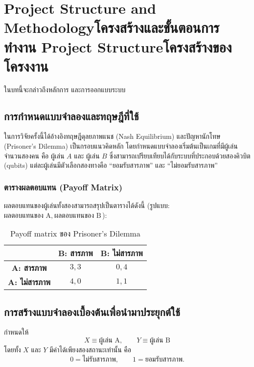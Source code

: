 \chapter{\ifproject%
\ifenglish Project Structure and Methodology\else โครงสร้างและขั้นตอนการทำงาน\fi
\else%
\ifenglish Project Structure\else โครงสร้างของโครงงาน\fi
\fi
}

ในบทนี้จะกล่าวถึงหลักการ และการออกแบบระบบ

\section{การกำหนดแบบจำลองและทฤษฎีที่ใช้}
ในการวิจัยครั้งนี้ได้อ้างอิงทฤษฎีดุลยภาพแนช (Nash Equilibrium) และปัญหานักโทษ (Prisoner's Dilemma) เป็นกรอบแนวคิดหลัก โดยกำหนดแบบจำลองเริ่มต้นเป็นเกมที่มีผู้เล่นจำนวนสองคน คือ ผู้เล่น \(A\) และ ผู้เล่น \(B\) ซึ่งสามารถเปรียบเทียบได้กับระบบที่ประกอบด้วยสองคิวบิต (qubits) แต่ละผู้เล่นมีตัวเลือกสองทางคือ ``ยอมรับสารภาพ'' และ ``ไม่ยอมรับสารภาพ''

\subsection{ตารางผลตอบแทน (Payoff Matrix)}
ผลตอบแทนของผู้เล่นทั้งสองสามารถสรุปเป็นตารางได้ดังนี้ (รูปแบบ: \( \text{ผลตอบแทนของ A},\ \text{ผลตอบแทนของ B} \)):

\begin{table}[h]
  \centering
  \caption{Payoff matrix ของ Prisoner's Dilemma}
  \begin{tabular}{c|c|c}
    & \textbf{B: สารภาพ} & \textbf{B: ไม่สารภาพ} \\ \hline
    \textbf{A: สารภาพ}    & \(3,3\) & \(0,4\) \\ \hline
    \textbf{A: ไม่สารภาพ} & \(4,0\) & \(1,1\)
  \end{tabular}
\end{table}

\section{การสร้างแบบจำลองเบื้องต้นเพื่อนำมาประยุกต์ใช้}
กำหนดให้
\[
X \equiv \text{ผู้เล่น A},\qquad Y \equiv \text{ผู้เล่น B}
\]
โดยทั้ง \(X\) และ \(Y\) มีค่าได้เพียงสองสถานะเท่านั้น คือ
\[
0 = \text{ไม่รับสารภาพ},\qquad 1 = \text{ยอมรับสารภาพ}.
\]

